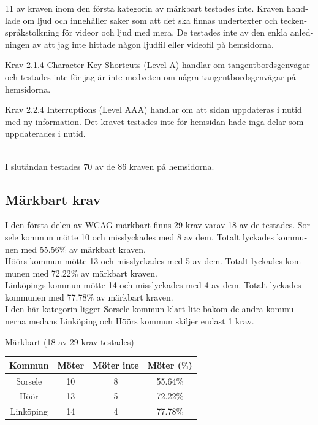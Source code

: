 \documentclass[11p]{article}
\begin{document}
\begin{otherlanguage}{swedish}
    11 av kraven inom den första kategorin av märkbart testades inte.
    Kraven handlade om ljud och innehåller saker som att det ska finnas undertexter och teckenspråkstolkning för videor och ljud med mera.
    De testades inte av den enkla anledningen av att jag inte hittade någon ljudfil eller videofil på hemsidorna.

    Krav 2.1.4 Character Key Shortcuts (Level A) handlar om tangentbordsgenvägar och testades inte för jag är inte medveten om några tangentbordsgenvägar på hemsidorna.

    Krav 2.2.4 Interruptions (Level AAA) handlar om att sidan uppdateras i nutid med ny information.
    Det kravet testades inte för hemsidan hade inga delar som uppdaterades i nutid.

  \\  I slutändan testades 70 av de 86 kraven på hemsidorna.
    \subsection{Märkbart krav}
    I den första delen av WCAG märkbart finns 29 krav varav 18 av de testades.
    Sorsele kommun mötte 10 och misslyckades med 8 av dem.
    Totalt lyckades kommunen med 55.56$\%$ av märkbart kraven.
    \\Höörs kommun mötte 13 och misslyckades med 5 av dem.
    Totalt lyckades kommunen med 72.22$\%$ av märkbart kraven.
    \\Linköpings kommun mötte 14 och misslyckades med 4 av dem.
    Totalt lyckades kommunen med 77.78$\%$ av märkbart kraven.
    \\I den här kategorin ligger Sorsele kommun klart lite bakom de andra kommunerna medans Linköping och Höörs kommun skiljer endast 1 krav.

    \begin{center}
    Märkbart (18 av 29 krav testades)

    \begin{tabular}{ |c|c|c|c|}
        \hline
        Kommun & Möter & Möter inte & Möter ($\%$) \\  \hline
        Sorsele & 10 & 8 & 55.64$\%$ \\ \hline
        Höör & 13 & 5 & 72.22$\%$ \\ \hline
        Linköping & 14 & 4 & 77.78$\%$ \\ \hline
    \end{tabular}
    \end{center}


\end{otherlanguage}
\end{document}
